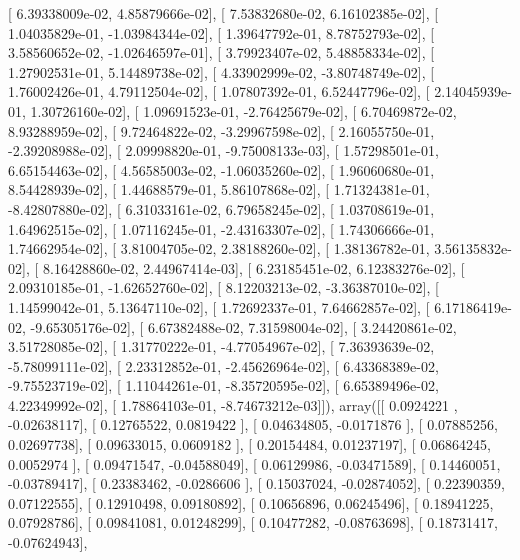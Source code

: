 \documentclass{article}
\begin{document}
       [  6.39338009e-02,   4.85879666e-02],
       [  7.53832680e-02,   6.16102385e-02],
       [  1.04035829e-01,  -1.03984344e-02],
       [  1.39647792e-01,   8.78752793e-02],
       [  3.58560652e-02,  -1.02646597e-01],
       [  3.79923407e-02,   5.48858334e-02],
       [  1.27902531e-01,   5.14489738e-02],
       [  4.33902999e-02,  -3.80748749e-02],
       [  1.76002426e-01,   4.79112504e-02],
       [  1.07807392e-01,   6.52447796e-02],
       [  2.14045939e-01,   1.30726160e-02],
       [  1.09691523e-01,  -2.76425679e-02],
       [  6.70469872e-02,   8.93288959e-02],
       [  9.72464822e-02,  -3.29967598e-02],
       [  2.16055750e-01,  -2.39208988e-02],
       [  2.09998820e-01,  -9.75008133e-03],
       [  1.57298501e-01,   6.65154463e-02],
       [  4.56585003e-02,  -1.06035260e-02],
       [  1.96060680e-01,   8.54428939e-02],
       [  1.44688579e-01,   5.86107868e-02],
       [  1.71324381e-01,  -8.42807880e-02],
       [  6.31033161e-02,   6.79658245e-02],
       [  1.03708619e-01,   1.64962515e-02],
       [  1.07116245e-01,  -2.43163307e-02],
       [  1.74306666e-01,   1.74662954e-02],
       [  3.81004705e-02,   2.38188260e-02],
       [  1.38136782e-01,   3.56135832e-02],
       [  8.16428860e-02,   2.44967414e-03],
       [  6.23185451e-02,   6.12383276e-02],
       [  2.09310185e-01,  -1.62652760e-02],
       [  8.12203213e-02,  -3.36387010e-02],
       [  1.14599042e-01,   5.13647110e-02],
       [  1.72692337e-01,   7.64662857e-02],
       [  6.17186419e-02,  -9.65305176e-02],
       [  6.67382488e-02,   7.31598004e-02],
       [  3.24420861e-02,   3.51728085e-02],
       [  1.31770222e-01,  -4.77054967e-02],
       [  7.36393639e-02,  -5.78099111e-02],
       [  2.23312852e-01,  -2.45626964e-02],
       [  6.43368389e-02,  -9.75523719e-02],
       [  1.11044261e-01,  -8.35720595e-02],
       [  6.65389496e-02,   4.22349992e-02],
       [  1.78864103e-01,  -8.74673212e-03]]), array([[ 0.0924221 , -0.02638117],
       [ 0.12765522,  0.0819422 ],
       [ 0.04634805, -0.0171876 ],
       [ 0.07885256,  0.02697738],
       [ 0.09633015,  0.0609182 ],
       [ 0.20154484,  0.01237197],
       [ 0.06864245,  0.0052974 ],
       [ 0.09471547, -0.04588049],
       [ 0.06129986, -0.03471589],
       [ 0.14460051, -0.03789417],
       [ 0.23383462, -0.0286606 ],
       [ 0.15037024, -0.02874052],
       [ 0.22390359,  0.07122555],
       [ 0.12910498,  0.09180892],
       [ 0.10656896,  0.06245496],
       [ 0.18941225,  0.07928786],
       [ 0.09841081,  0.01248299],
       [ 0.10477282, -0.08763698],
       [ 0.18731417, -0.07624943],
\end{document}
